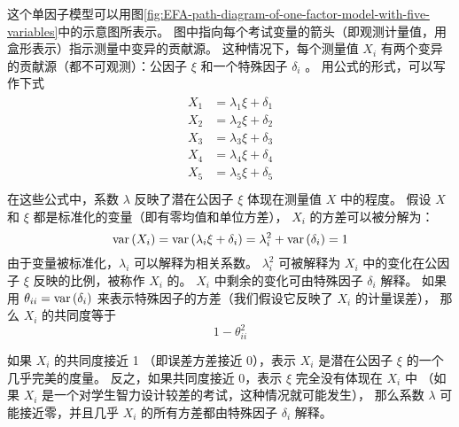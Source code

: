 这个单因子模型可以用图\ref{fig:EFA-path-diagram-of-one-factor-model-with-five-variables}中的示意图所表示。
图中指向每个考试变量的箭头（即观测计量值，用盒形表示）指示测量中变异的贡献源。
这种情况下，每个测量值 $ X_i $ 有两个变异的贡献源（都不可观测）：公因子 $ \xi $ 和一个特殊因子 $ \delta_i $ 。
用公式的形式，可以写作下式
\begin{align}
    \begin{split}
        X_1 & = \lambda_1\xi + \delta_1 \\ 
        X_2 & = \lambda_2\xi + \delta_2 \\ 
        X_3 & = \lambda_3\xi + \delta_3 \\ 
        X_4 & = \lambda_4\xi + \delta_4 \\ 
        X_5 & = \lambda_5\xi + \delta_5 \\ 
    \end{split}
\end{align}
在这些公式中，系数 $ \lambda $ 反映了潜在公因子 $ \xi $ 体现在测量值 $ X $ 中的程度。
假设 $ X $ 和 $ \xi $ 都是标准化的变量（即有零均值和单位方差）， $ X_i $ 的方差可以被分解为：
\begin{equation}
    \mathrm{var}\left({X_i}\right) = \mathrm{var}\left({\lambda_i\xi + \delta_i}\right) = \lambda_i^2 + \mathrm{var}\left({\delta_i}\right) = 1
\end{equation}
由于变量被标准化，$ \lambda_i $ 可以解释为相关系数。
$ \lambda_i^2 $ 可被解释为 $ X_i $ 中的变化在公因子 $ \xi $ 反映的比例，被称作 $ X_i $ 的。
$ X_i $ 中剩余的变化可由特殊因子 $ \delta_i $ 解释。
如果用 $ \theta_{ii} = \mathrm{var}\left({\delta_i}\right) $ 来表示特殊因子的方差（我们假设它反映了 $ X_i $ 的计量误差），
那么 $ X_i $ 的共同度等于
\begin{equation}
    1 - \theta_{ii}^2
\end{equation}

如果 $ X_i $ 的共同度接近 1 （即误差方差接近 0），表示 $ X_i $ 是潜在公因子 $ \xi $ 的一个几乎完美的度量。
反之，如果共同度接近 0，表示 $ \xi $ 完全没有体现在 $ X_i $ 中
（如果 $ X_i $ 是一个对学生智力设计较差的考试，这种情况就可能发生），
那么系数 $ \lambda $ 可能接近零，并且几乎 $ X_i $ 的所有方差都由特殊因子 $ \delta_i $ 解释。

